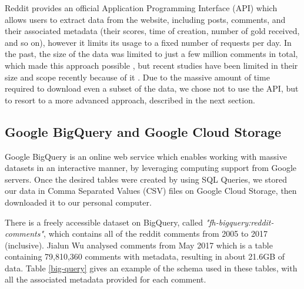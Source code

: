 \documentclass[bsc,frontabs,twoside,singlespacing,parskip,deptreport]{infthesis}
\begin{document}
Reddit provides an official Application Programming Interface (API) which allows users to extract data from the website, including posts, comments, and their associated metadata (their scores, time of creation, number of gold received, and so on), however it limits its usage to a fixed number of requests per day. In the past, the size of the data was limited to just a few million comments in total, which made this approach possible \cite{singer}, but recent studies have been limited in their size and scope recently because of it \cite{weninger} \cite{autmanHasan2016Acso}. Due to the massive amount of time required to download even a subset of the data, we chose not to use the API, but to resort to a more advanced approach, described in the next section.

\subsection{Google BigQuery and Google Cloud Storage}\label{bigquery}

Google BigQuery is an online web service which enables working with massive datasets in an interactive manner, by leveraging computing support from Google servers. Once the desired tables were created by using SQL Queries, we stored our data in Comma Separated Values (CSV) files on Google Cloud Storage, then downloaded it to our personal computer.

There is a freely accessible dataset on BigQuery, called \textit{"fh-bigquery:reddit-comments"}, which contains all of the reddit comments from 2005 to 2017 (inclusive). Jialun Wu \cite{masters} analysed comments from May 2017 which is a table containing 79,810,360 comments with metadata, resulting in about 21.6GB of data. Table \ref{big-query} gives an example of the schema used in these tables, with all the associated metadata provided for each comment.
\end{document}
